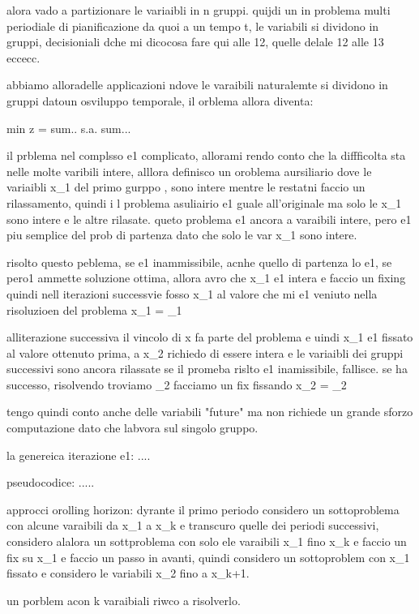 alora vado a partizionare le variaibli in n gruppi. quijdi un in problema multi periodiale di pianificazione da quoi a un tempo t, le variabili si dividono in gruppi, decisioniali dche mi dicocosa fare qui alle 12, quelle delale 12 alle 13 eccecc.

abbiamo alloradelle applicazioni ndove le varaibili naturalemte si dividono in gruppi datoun osviluppo temporale, il orblema allora diventa:

min z = sum..
s.a.
sum...

il prblema nel complsso e1 complicato, allorami rendo conto che la diffficolta sta nelle molte varibili intere, alllora definisco un oroblema aursiliario dove le variaibli x_1 del primo gurppo , sono intere mentre le restatni faccio un rilassamento, quindi i l problema asuliairio e1 guale all'originale ma solo le x_1 sono intere e le altre rilasate. queto problema e1 ancora a varaibili intere, pero e1 piu semplice del prob di partenza dato che solo le var x_1 sono intere.

risolto questo peblema, se e1 inammissibile, acnhe quello di partenza lo e1, se pero1 ammette soluzione ottima, allora avro che x_1 e1 intera e faccio un fixing quindi nell iterazioni successvie fosso x_1 al valore che mi e1 veniuto nella risoluzioen del problema 
x_1 = _1

alliterazione successiva il vincolo di x fa parte del problema e uindi x_1 e1 fissato al valore ottenuto prima, a x_2 richiedo di essere intera e le variaibli dei gruppi successivi sono ancora rilassate se il promeba rislto e1 inamissibile, fallisce. se ha successo, risolvendo troviamo \oveline{}_2 facciamo un fix fissando x_2 = \oveline{}_2

tengo quindi conto anche delle variabili "future" ma non richiede un grande sforzo computazione dato che labvora sul singolo gruppo.

la genereica iterazione e1:
....

pseudocodice:
.....



approcci orolling horizon:
dyrante il primo periodo considero un sottoproblema con alcune varaibili da x_1 a x_k e transcuro quelle dei periodi successivi, considero alalora un sottproblema con solo ele varaibili x_1 fino x_k e faccio un fix su x_1 e faccio un passo in avanti, quindi considero un sottoproblem con x_1 fissato e considero le variabili x_2 fino a x_k+1.

un porblem acon k varaibiali riwco a risolverlo.

